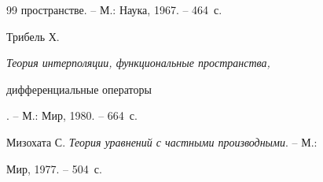 \begin{thebibliography}{99}
{пространстве}. -- М.: Наука, 1967. -- 464~с.




Трибель Х. {\em Теория интерполяции, функциональные пространства,


дифференциальные операторы}. -- М.: Мир, 1980. -- 664~с.




Мизохата С. {\em Теория уравнений с частными производными}. -- М.:


Мир, 1977. -- 504~с.





\end{thebibliography}





\vskip 2cm












\label{end}





